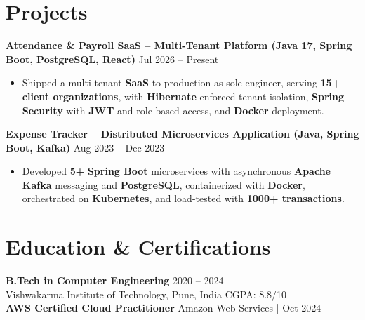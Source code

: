 \documentclass[a4paper,10pt]{article}
\begin{document}
\section*{Projects}

\textbf{Attendance \& Payroll SaaS -- Multi-Tenant Platform (Java 17, Spring Boot, PostgreSQL, React)} \hfill Jul 2026 -- Present
\begin{itemize}[leftmargin=*]
    \item Shipped a multi-tenant \textbf{SaaS} to production as sole engineer, serving \textbf{15+ client organizations}, with \textbf{Hibernate}-enforced tenant isolation, \textbf{Spring Security} with \textbf{JWT} and role-based access, and \textbf{Docker} deployment.
\end{itemize}

\textbf{Expense Tracker -- Distributed Microservices Application (Java, Spring Boot, Kafka)} \hfill Aug 2023 -- Dec 2023
\begin{itemize}[leftmargin=*]
    \item Developed \textbf{5+} \textbf{Spring Boot} microservices with asynchronous \textbf{Apache Kafka} messaging and \textbf{PostgreSQL}, containerized with \textbf{Docker}, orchestrated on \textbf{Kubernetes}, and load-tested with \textbf{1000+ transactions}.
\end{itemize}

\section*{Education \& Certifications}
\textbf{B.Tech in Computer Engineering} \hfill 2020 -- 2024 \\
Vishwakarma Institute of Technology, Pune, India \hfill CGPA: 8.8/10 \\
\textbf{AWS Certified Cloud Practitioner} \hfill Amazon Web Services \;|\; Oct 2024
\end{document}
